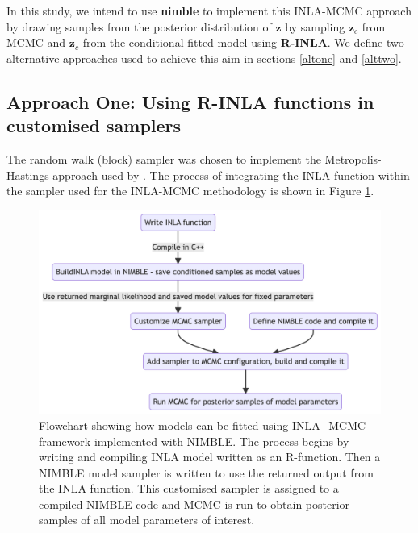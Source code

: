 \documentclass[
]{article}
\begin{document}
In this study, we intend to use \textbf{nimble} to implement this
INLA-MCMC approach by drawing samples from the posterior distribution of
\(\mathbf{z}\) by sampling \(\mathbf{z}_{c}\) from MCMC and
\(\mathbf{z}_{c}\) from the conditional fitted model using
\textbf{R-INLA}. We define two alternative approaches used to achieve
this aim in sections \ref{altone} and \ref{alttwo}.

\hypertarget{approach-one-using-r-inla-functions-in-customised-samplers}{%
\subsection{\texorpdfstring{Approach One: Using R-INLA functions in
customised samplers
\label{altone}}{Approach One: Using R-INLA functions in customised samplers }}\label{approach-one-using-r-inla-functions-in-customised-samplers}}

The random walk (block) sampler was chosen to implement the
Metropolis-Hastings approach used by \citet{gomez2018markov}. The
process of integrating the INLA function within the sampler used for the
INLA-MCMC methodology is shown in Figure \ref{fig-flowchart}.

\begin{figure}

{\centering \includegraphics{flowxchartINLANimble.png}

}

\caption{\label{fig-flowchart}Flowchart showing how models can be fitted
using INLA\_MCMC framework implemented with NIMBLE. The process begins
by writing and compiling INLA model written as an R-function. Then a
NIMBLE model sampler is written to use the returned output from the INLA
function. This customised sampler is assigned to a compiled NIMBLE code
and MCMC is run to obtain posterior samples of all model parameters of
interest.}

\end{figure}
\end{document}
